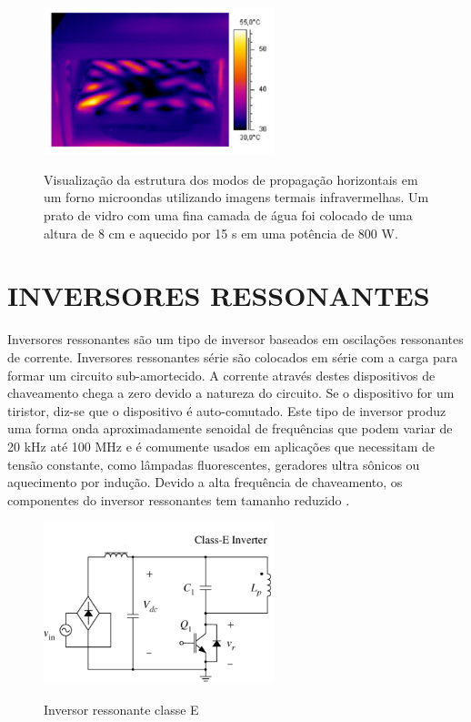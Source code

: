 \begin{figure}[!htb]
    \centering
    \caption{Visualização da estrutura dos modos de propagação horizontais em um forno microondas utilizando imagens termais infravermelhas. Um prato de vidro com uma fina camada de água foi colocado de uma altura de 8 cm e aquecido por 15 s em uma potência de 800 W.}
    \includegraphics[width=0.6\textwidth]{./dados/figuras/micronodes}
    \label{fig:figura-fontferro}
\end{figure}


\section{INVERSORES RESSONANTES}
\label{sec:inverter}

Inversores ressonantes são um tipo de inversor baseados em oscilações ressonantes de corrente.  Inversores ressonantes série são colocados em série com a carga para formar um circuito sub-amortecido. A corrente através destes dispositivos de chaveamento chega a zero devido a natureza do circuito. Se o dispositivo for um tiristor, diz-se que o dispositivo é auto-comutado. 
Este tipo de inversor produz uma forma onda aproximadamente senoidal de frequências que podem variar de 20 kHz até 100 MHz e é comumente usados em aplicações que necessitam de tensão constante, como lâmpadas fluorescentes, geradores ultra sônicos ou aquecimento por indução. Devido a alta frequência de chaveamento, os componentes do inversor ressonantes tem tamanho reduzido \cite{Rashid}.

\begin{figure}[!htb]
    \centering
    \caption{Inversor ressonante classe E}
    \includegraphics[width=0.6\textwidth]{./dados/figuras/inverter}
    \label{fig:figura-fontferro}
\end{figure}


